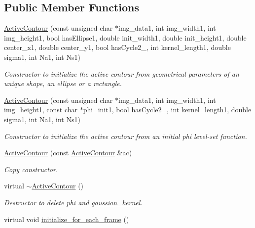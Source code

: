 \subsection*{Public Member Functions}
\begin{DoxyCompactItemize}
\item 
\hyperlink{classofeli_1_1_active_contour_abfbc2ecc4b6d511c277eb512ee3749cf}{Active\-Contour} (const unsigned char $\ast$img\-\_\-data1, int img\-\_\-width1, int img\-\_\-height1, bool has\-Ellipse1, double init\-\_\-width1, double init\-\_\-height1, double center\-\_\-x1, double center\-\_\-y1, bool has\-Cycle2\-\_, int kernel\-\_\-length1, double sigma1, int Na1, int Ns1)
\begin{DoxyCompactList}\small\item\em Constructor to initialize the active contour from geometrical parameters of an unique shape, an ellipse or a rectangle. \end{DoxyCompactList}\item 
\hyperlink{classofeli_1_1_active_contour_a38a162e1c928418608067e35c01c1970}{Active\-Contour} (const unsigned char $\ast$img\-\_\-data1, int img\-\_\-width1, int img\-\_\-height1, const char $\ast$phi\-\_\-init1, bool has\-Cycle2\-\_, int kernel\-\_\-length1, double sigma1, int Na1, int Ns1)
\begin{DoxyCompactList}\small\item\em Constructor to initialize the active contour from an initial phi level-\/set function. \end{DoxyCompactList}\item 
\hypertarget{classofeli_1_1_active_contour_a5d077e0b276dea77ea4cdf62ccc50901}{\hyperlink{classofeli_1_1_active_contour_a5d077e0b276dea77ea4cdf62ccc50901}{Active\-Contour} (const \hyperlink{classofeli_1_1_active_contour}{Active\-Contour} \&ac)}\label{classofeli_1_1_active_contour_a5d077e0b276dea77ea4cdf62ccc50901}

\begin{DoxyCompactList}\small\item\em Copy constructor. \end{DoxyCompactList}\item 
\hypertarget{classofeli_1_1_active_contour_af1af6dc1037dda5738dc9964a9476b84}{virtual \hyperlink{classofeli_1_1_active_contour_af1af6dc1037dda5738dc9964a9476b84}{$\sim$\-Active\-Contour} ()}\label{classofeli_1_1_active_contour_af1af6dc1037dda5738dc9964a9476b84}

\begin{DoxyCompactList}\small\item\em Destructor to delete \hyperlink{classofeli_1_1_active_contour_aacb03a6ded4ca51cb52f58aeff955ef7}{phi} and \hyperlink{classofeli_1_1_active_contour_a0f8558877cf436d932838173ba5b8061}{gaussian\-\_\-kernel}. \end{DoxyCompactList}\item 
\hypertarget{classofeli_1_1_active_contour_ac1d127818cc396568532a662951f6f8e}{virtual void \hyperlink{classofeli_1_1_active_contour_ac1d127818cc396568532a662951f6f8e}{initialize\-\_\-for\-\_\-each\-\_\-frame} ()}\label{classofeli_1_1_active_contour_ac1d127818cc396568532a662951f6f8e}


\end{DoxyCompactItemize}
